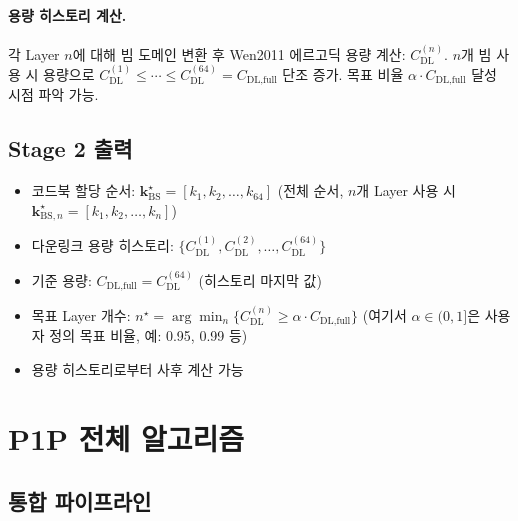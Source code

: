 \documentclass[10pt]{article}
\begin{document}
\paragraph{용량 히스토리 계산.}
각 Layer $n$에 대해 빔 도메인 변환 후 Wen2011 에르고딕 용량 계산: $C_{\text{DL}}^{(n)}$. $n$개 빔 사용 시 용량으로 $C_{\text{DL}}^{(1)} \leq \cdots \leq C_{\text{DL}}^{(64)} = C_{\text{DL,full}}$ 단조 증가. 목표 비율 $\alpha \cdot C_{\text{DL,full}}$ 달성 시점 파악 가능.

\subsection{Stage 2 출력}

\begin{itemize}
    \item 코드북 할당 순서: $\boldsymbol{k}_{\text{BS}}^{\star} = [k_1, k_2, \ldots, k_{64}]$ (전체 순서, $n$개 Layer 사용 시 $\boldsymbol{k}_{\text{BS},n}^{\star} = [k_1, k_2, \ldots, k_n]$)
    \item 다운링크 용량 히스토리: $\{C_{\text{DL}}^{(1)}, C_{\text{DL}}^{(2)}, \ldots, C_{\text{DL}}^{(64)}\}$
    \item 기준 용량: $C_{\text{DL,full}} = C_{\text{DL}}^{(64)}$ (히스토리 마지막 값)
    \item 목표 Layer 개수: $n^{\star} = \arg\min_n \{C_{\text{DL}}^{(n)} \geq \alpha \cdot C_{\text{DL,full}}\}$ (여기서 $\alpha \in (0, 1]$은 사용자 정의 목표 비율, 예: 0.95, 0.99 등)
    \item 용량 히스토리로부터 사후 계산 가능
\end{itemize}

\section{P1P 전체 알고리즘}

\subsection{통합 파이프라인}
\end{document}
